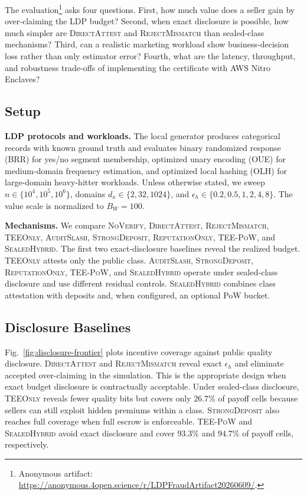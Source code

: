 \documentclass[conference]{IEEEtran}
\newcommand{\eps}{\epsilon}
\newcommand{\NoVerify}{\textsc{NoVerify}}
\newcommand{\DirectAttest}{\textsc{DirectAttest}}
\newcommand{\RejectMismatch}{\textsc{RejectMismatch}}
\newcommand{\TEEOnly}{\textsc{TEEOnly}}
\newcommand{\AuditSlash}{\textsc{AuditSlash}}
\newcommand{\StrongDeposit}{\textsc{StrongDeposit}}
\newcommand{\ReputationOnly}{\textsc{ReputationOnly}}
\newcommand{\TEEPOW}{\textsc{TEE-PoW}}
\newcommand{\Hybrid}{\textsc{SealedHybrid}}
\begin{document}
The evaluation\footnote{Anonymous artifact: \url{https://anonymous.4open.science/r/LDPFraudArtifact20260609/}.} asks four questions. First, how much value does a seller gain by over-claiming the LDP budget? Second, when exact disclosure is possible, how much simpler are \DirectAttest{} and \RejectMismatch{} than sealed-class mechanisms? Third, can a realistic marketing workload show business-decision loss rather than only estimator error? Fourth, what are the latency, throughput, and robustness trade-offs of implementing the certificate with AWS Nitro Enclaves?

\subsection{Setup}

\textbf{LDP protocols and workloads.} The local generator produces categorical records with known ground truth and evaluates binary randomized response (BRR) for yes/no segment membership, optimized unary encoding (OUE) for medium-domain frequency estimation, and optimized local hashing (OLH) for large-domain heavy-hitter workloads. Unless otherwise stated, we sweep $n\in\{10^4,10^5,10^6\}$, domains $d_x\in\{2,32,1024\}$, and $\eps_h\in\{0.2,0.5,1,2,4,8\}$. The value scale is normalized to $B_W=100$.

\textbf{Mechanisms.} We compare \NoVerify{}, \DirectAttest{}, \RejectMismatch{}, \TEEOnly{}, \AuditSlash{}, \StrongDeposit{}, \ReputationOnly{}, \TEEPOW{}, and \Hybrid{}. The first two exact-disclosure baselines reveal the realized budget. \TEEOnly{} attests only the public class. \AuditSlash{}, \StrongDeposit{}, \ReputationOnly{}, \TEEPOW{}, and \Hybrid{} operate under sealed-class disclosure and use different residual controls. \Hybrid{} combines class attestation with deposits and, when configured, an optional PoW bucket.

\subsection{Disclosure Baselines}

Fig.~\ref{fig:disclosure-frontier} plots incentive coverage against public quality disclosure. \DirectAttest{} and \RejectMismatch{} reveal exact $\eps_h$ and eliminate accepted over-claiming in the simulation. This is the appropriate design when exact budget disclosure is contractually acceptable. Under sealed-class disclosure, \TEEOnly{} reveals fewer quality bits but covers only $26.7\%$ of payoff cells because sellers can still exploit hidden premiums within a class. \StrongDeposit{} also reaches full coverage when full escrow is enforceable. \TEEPOW{} and \Hybrid{} avoid exact disclosure and cover $93.3\%$ and $94.7\%$ of payoff cells, respectively.
\end{document}
